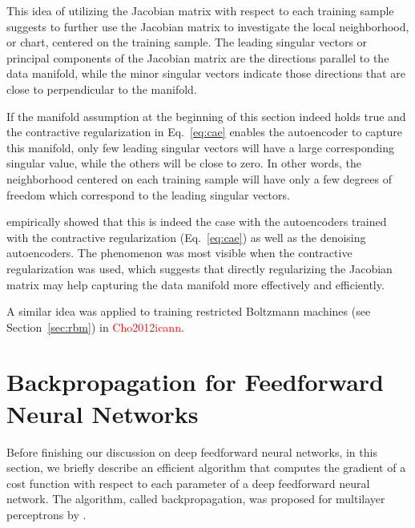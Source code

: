 \documentclass{now}
\newcommand{\alert}[1]{\textcolor{red}{#1}}
\newcommand{\citepub}[1]{\alert{#1}}
\begin{document}
This idea of utilizing the Jacobian matrix with respect to
each training sample suggests to further use the Jacobian
matrix to investigate the local neighborhood, or chart,
centered on the training sample. The leading singular
vectors or principal components of the Jacobian matrix are
the directions parallel to the data manifold, while the
minor singular vectors indicate those directions that are
close to perpendicular to the manifold.

If the manifold assumption at the beginning of this section
indeed holds true and the contractive regularization in
Eq.~\eqref{eq:cae} enables the autoencoder to capture this
manifold, only few leading singular vectors will have a large
corresponding singular value, while the others will be
close to zero. In other words, the neighborhood
centered on each training sample will have only a few
degrees of freedom which correspond to the leading singular
vectors.

\citet{Rifai2011} empirically showed that this is indeed the
case with the autoencoders trained with the contractive
regularization (Eq.~\eqref{eq:cae}) as well as the denoising
autoencoders. The phenomenon was most visible when the
contractive regularization was used, which suggests that
directly regularizing the Jacobian matrix may help capturing
the data manifold more effectively and efficiently.

A similar idea was applied to training restricted Boltzmann
machines (see Section~\ref{sec:rbm}) in
\citepub{Cho2012icann}.


\section{Backpropagation for Feedforward Neural Networks}
\label{sec:backprop}

Before finishing our discussion on deep feedforward neural
networks, in this section, we briefly describe an efficient
algorithm that computes the gradient of a cost function with
respect to each parameter of a deep feedforward neural network.
The algorithm, called backpropagation, was proposed for
multilayer perceptrons by \citet{Rumelhart1986}. 

\end{document}
